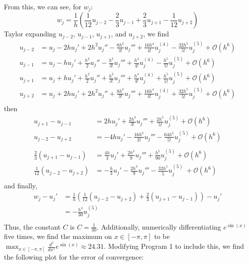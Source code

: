\documentclass{article}
\begin{document}
From this, we can see, for $w_j$:
\[w_j = \frac{1}{h}\left(\frac{1}{12}u_{j-2} - \frac{2}{3}u_{j-1} + \frac{2}{3}u_{j+1} - \frac{1}{12}u_{j+2}\right)\]
Taylor expanding $u_{j-2}$, $u_{j-1}$, $u_{j+1}$, and $u_{j+2}$, we find
\begin{align*}
    u_{j-2} &= u_j - 2hu_j' + 2h^2u_j'' - \frac{8h^3}{3!}u_j''' + \frac{16h^4}{4!}u_j^{(4)} - \frac{32h^5}{5!}u_j^{(5)} + \mathcal{O}(h^6) \\
    u_{j-1} &= u_j - hu_j' + \frac{h^2}{2}u_j'' - \frac{h^3}{3!}u_j''' + \frac{h^4}{4!}u_j^{(4)} - \frac{h^5}{5!}u_j^{(5)} + \mathcal{O}(h^6) \\
    u_{j+1} &= u_j + hu_j' + \frac{h^2}{2}u_j'' + \frac{h^3}{3!}u_j''' + \frac{h^4}{4!}u_j^{(4)} + \frac{h^5}{5!}u_j^{(5)} + \mathcal{O}(h^6) \\
    u_{j+2} &= u_j + 2hu_j' + 2h^2u_j'' + \frac{8h^3}{3!}u_j''' + \frac{16h^4}{4!}u_j^{(4)} + \frac{32h^5}{5!}u_j^{(5)} + \mathcal{O}(h^6) \\
\end{align*}
then
\begin{align*}
    u_{j+1} - u_{j-1} &= 2hu_j' + \frac{2h^3}{3!}u_j''' + \frac{2h^5}{5!}u_j^{(5)} + \mathcal{O}(h^6)\\
    u_{j-2} - u_{j+2} &= -4hu_j' - \frac{16h^3}{3!}u_j''' - \frac{64h^5}{5!}u_j^{(5)} + \mathcal{O}(h^6)\\
    \\
    \frac{2}{3}\left(u_{j+1} - u_{j-1}\right) &= \frac{4h}{3}u_j' + \frac{2h^3}{9}u_j''' + \frac{h^5}{90}u_j^{(5)} + \mathcal{O}(h^6) \\
    \frac{1}{12}\left(u_{j-2} - u_{j+2}\right) &= -\frac{h}{3}u_j' - \frac{2h^3}{9}u_j''' - \frac{32h^5}{5}u_j^{(5)}\ + \mathcal{O}(h^6)\\
\end{align*}
and finally, 
\begin{align*}
    w_j - u_j' &= \frac{1}{h}\left(\frac{1}{12}(u_{j-2}-u_{j+2}) + \frac{2}{3}(u_{j+1} - u_{j-1})\right) - u_j' \\
    &= -\frac{h^4}{30}u_j^{(5)} \\
\end{align*}
Thus, the constant $C$ is $C = \frac{1}{30}$. Additionally, numerically differentiating $e^{\sin(x)}$ five times, we find the maximum on $x\in [-\pi, \pi]$ to be $\max_{x\in [-\pi, \pi]} \frac{d^5}{dx^5}e^{\sin(x)} \approx 24.31$. Modifying Program 1 to include this, we find the following plot for the error of convergence:
\end{document}
